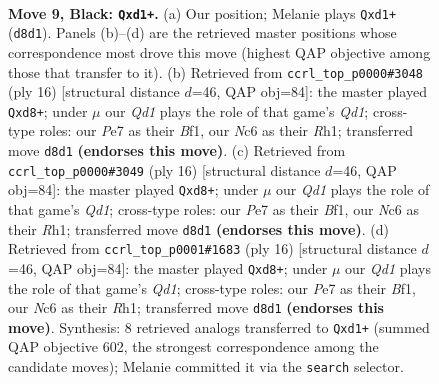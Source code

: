 \documentclass[11pt]{article}
\begin{document}
\clearpage

\begin{figure}[p]\centering
\begin{subfigure}{0.46\textwidth}\centering
\resizebox{\linewidth}{!}{%
\newchessgame
\chessboard[
  setfen={r1bqk2r/ppp1ppbp/1nn3p1/4P3/8/1B3N2/PPP1KPPP/RNBQ2R1 b kq - 0 9},
  showmover=false,
  pgfstyle=straightmove, color=movearrow, markmove={d8-d1}
]}
\caption{}
\end{subfigure}\hfill
\begin{subfigure}{0.46\textwidth}\centering
\resizebox{\linewidth}{!}{%
\newchessgame
\chessboard[
  setfen={r1bqk1nr/1pp2ppp/1bn5/p3p3/2P5/P1N2N2/1P2PPPP/R1BQKB1R w KQkq - 0 9},
  showmover=false,
  pgfstyle=straightmove, color=movearrow, markmove={d1-d8}
]}
\caption{}
\end{subfigure}
\\[4pt]
\begin{subfigure}{0.46\textwidth}\centering
\resizebox{\linewidth}{!}{%
\newchessgame
\chessboard[
  setfen={r1bqk1nr/1pp2ppp/1bn5/p3p3/2P5/P1N2N2/1P2PPPP/R1BQKB1R w KQkq - 0 9},
  showmover=false,
  pgfstyle=straightmove, color=movearrow, markmove={d1-d8}
]}
\caption{}
\end{subfigure}\hfill
\begin{subfigure}{0.46\textwidth}\centering
\resizebox{\linewidth}{!}{%
\newchessgame
\chessboard[
  setfen={r1bqk1nr/1pp2ppp/1bn5/p3p3/2P5/P1N2N2/1P2PPPP/R1BQKB1R w KQkq - 0 9},
  showmover=false,
  pgfstyle=straightmove, color=movearrow, markmove={d1-d8}
]}
\caption{}
\end{subfigure}
\caption{\textbf{Move 9, Black: \texttt{Qxd1+}.} (a) Our position; Melanie plays \texttt{Qxd1+} (\texttt{d8d1}). Panels (b)--(d) are the retrieved master positions whose correspondence most drove this move (highest QAP objective among those that transfer to it). (b) Retrieved from \texttt{ccrl\_top\_p0000\#3048} (ply 16) [structural distance $d$=46, QAP obj=84]: the master played \texttt{Qxd8+}; under $\mu$ our \emph{Qd1} plays the role of that game's \emph{Qd1}; cross-type roles: our \emph{P}e7 as their \emph{B}f1, our \emph{N}c6 as their \emph{R}h1; transferred move \texttt{d8d1} \textbf{(endorses this move)}. (c) Retrieved from \texttt{ccrl\_top\_p0000\#3049} (ply 16) [structural distance $d$=46, QAP obj=84]: the master played \texttt{Qxd8+}; under $\mu$ our \emph{Qd1} plays the role of that game's \emph{Qd1}; cross-type roles: our \emph{P}e7 as their \emph{B}f1, our \emph{N}c6 as their \emph{R}h1; transferred move \texttt{d8d1} \textbf{(endorses this move)}. (d) Retrieved from \texttt{ccrl\_top\_p0001\#1683} (ply 16) [structural distance $d$=46, QAP obj=84]: the master played \texttt{Qxd8+}; under $\mu$ our \emph{Qd1} plays the role of that game's \emph{Qd1}; cross-type roles: our \emph{P}e7 as their \emph{B}f1, our \emph{N}c6 as their \emph{R}h1; transferred move \texttt{d8d1} \textbf{(endorses this move)}. Synthesis: 8 retrieved analogs transferred to \texttt{Qxd1+} (summed QAP objective 602, the strongest correspondence among the candidate moves); Melanie committed it via the \texttt{search} selector.}
\label{fig:thought-m17}
\end{figure}
\end{document}
